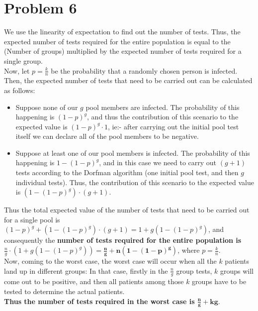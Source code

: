 \documentclass[a4paper,11pt]{article}
\numberwithin{definition}{section}
\numberwithin{mytheorem}{subsection}
\begin{document}
\section{Problem 6}
We use the linearity of expectation to find out the number of tests. Thus, the expected number of tests required for the entire population is equal to the
(Number of groups) multiplied by the expected number of tests required for a single group.\\
Now, let $p = \frac{k}{n}$ be the probability that a randomly chosen person is infected. Then, the expected number of tests that need to be carried out can be calculated as follows:
\begin{itemize}
    \item Suppose none of our $g$ pool members are infected. The probability of this happening is $(1-p)^g$, and thus the contribution of this scenario to the expected value is $(1-p)^g\cdot 1$, ie:- after carrying out the initial pool test itself we can declare all of the pool members to be negative.
    \item Suppose at least one of our pool members is infected. The probability of this happening is $1-(1-p)^g$, and in this case we need to carry out $(g+1)$ tests according to the Dorfman algorithm (one initial pool test, and then $g$ individual tests). Thus, the contribution of this scenario to the expected value is $(1-(1-p)^g)\cdot (g+1)$.
\end{itemize}
Thus the total expected value of the number of tests that need to be carried out for a single pool is $(1-p)^g + (1-(1-p)^g)\cdot (g+1) = 1 + g(1-(1-p)^g)$, and consequently the \textbf{number of tests required for the entire population is} $\frac{n}{g}\cdot (1 + g(1-(1-p)^g)) = \boldsymbol{\frac{n}{g} + n(1-(1-p)^g)}$, where $p = \frac{k}{n}$.\\
Now, coming to the worst case, the worst case will occur when all the $k$ patients land up in different groups: In that case, firstly in the $\frac{n}{g}$ group tests, $k$ groups will come out to be positive, and then all patients among those $k$ groups have to be tested to determine the actual patients.\\
\textbf{Thus the number of tests required in the worst case is $\boldsymbol{\frac{n}{g} + kg}$}.
\\
\end{document}
